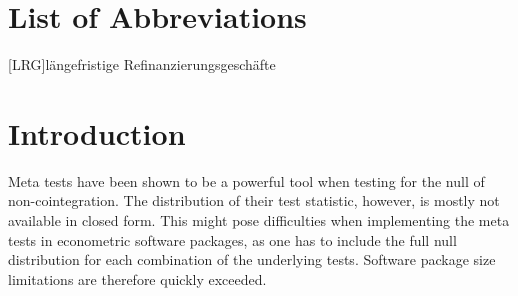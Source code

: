 \documentclass[12pt,a4paper]{article}
\begin{document}


{
\hypersetup{linkcolor=black}

\setcounter{tocdepth}{3}
\tableofcontents
}

\newpage
\listoffigures
{}

\listoftables
{}

\section*{List of Abbreviations}

\begin{adjustwidth}{1.5em}{0pt}

\begin{acronym}[dummyyyy]
 [LRG]{längefristige Refinanzierungsgeschäfte}

\end{acronym}

\end{adjustwidth}

\restoregeometry

\newpage
{} %

\hypertarget{introduction}{%
\section{Introduction}\label{introduction}}

Meta tests have been shown to be a powerful tool when testing for the
null of non-cointegration. The distribution of their test statistic,
however, is mostly not available in closed form. This might pose
difficulties when implementing the meta tests in econometric software
packages, as one has to include the full null distribution for each
combination of the underlying tests. Software package size limitations
are therefore quickly exceeded.
\end{document}
